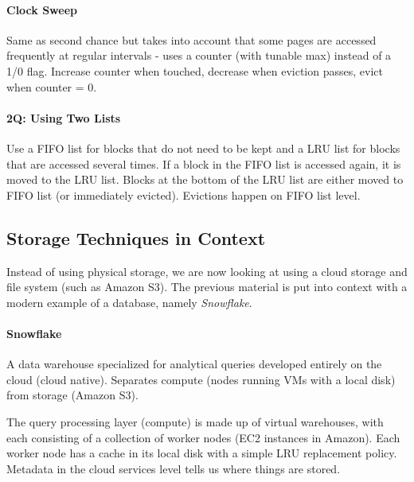 \paragraph{Clock Sweep}
Same as second chance but takes into account that some pages are accessed frequently at regular intervals - uses a counter (with tunable max) instead of a 1/0 flag. Increase counter when touched, decrease when eviction passes, evict when counter = 0.

\paragraph{2Q: Using Two Lists}
Use a FIFO list for blocks that do not need to be kept and a LRU list for blocks that are accessed several times. If a block in the FIFO list is accessed again, it is moved to the LRU list. Blocks at the bottom of the LRU list are either moved to FIFO list (or immediately evicted). Evictions happen on FIFO list level.



\subsection{Storage Techniques in Context}

Instead of using physical storage, we are now looking at using a cloud storage and file system (such as Amazon S3). The previous material is put into context with a modern example of a database, namely \textit{Snowflake}.

\paragraph{Snowflake}
A data warehouse specialized for analytical queries developed entirely on the cloud (cloud native). Separates compute (nodes running VMs with a local disk) from storage (Amazon S3).

The query processing layer (compute) is made up of virtual warehouses, with each consisting of a collection of worker nodes (EC2 instances in Amazon). Each worker node has a cache in its local disk with a simple LRU replacement policy. Metadata in the cloud services level tells us where things are stored. %

